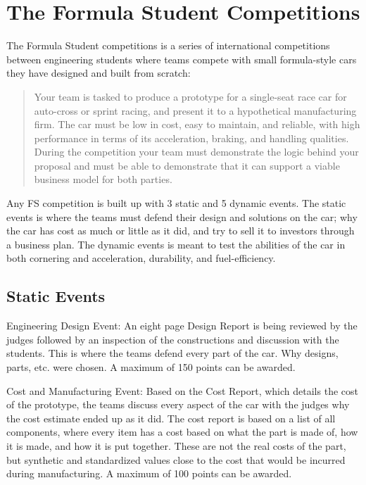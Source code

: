 
\chapter{The Formula Student Competitions}
\label{appendix:formula}
\clearpage
The Formula Student competitions is a series of international competitions 
between engineering students where teams compete with small formula-style cars 
they have designed and built from scratch:

\begin{quote}
Your team is tasked to produce a prototype for a single-seat race car for auto-cross or sprint racing, and 
present it to a hypothetical manufacturing firm. The car must be low in cost, easy to maintain, and reliable, with high 
performance in terms of its acceleration, braking, and  handling qualities. During the competition your team must demonstrate 
the logic behind your proposal and must be able to demonstrate that it can  support a viable business model for both parties.
 \cite{FS:challenge}
\end{quote}

\noindent Any FS competition is built up with 3 static and 5 dynamic events. The static events is where the teams must defend their design 
and solutions on the car; why the car has cost as much or little as it did, and try to sell it to investors through a 
business plan. The dynamic events is meant to test the abilities of the car in both cornering and acceleration, 
durability, and fuel-efficiency.

\section{Static Events}
Engineering Design Event: 
An eight page Design Report is being reviewed by the judges followed by an inspection of the constructions and discussion 
with the students. This is where the teams defend every part of the car. Why designs, parts, etc. were chosen. 
A maximum of 150 points can be awarded. \cite{FSG:disciplines}

Cost and Manufacturing Event:
Based on the Cost Report, which details the cost of the prototype, the teams discuss every aspect of the car with the judges 
why the cost estimate ended up as it did. The cost report is based on a list of all components, where every item has a cost 
based on what the part is made of, how it is made, and how it is put together. These are not the real costs of the part, but
synthetic and standardized values close to the cost that would be incurred during manufacturing. A maximum of 100 points can be awarded. \cite{FSG:disciplines}


